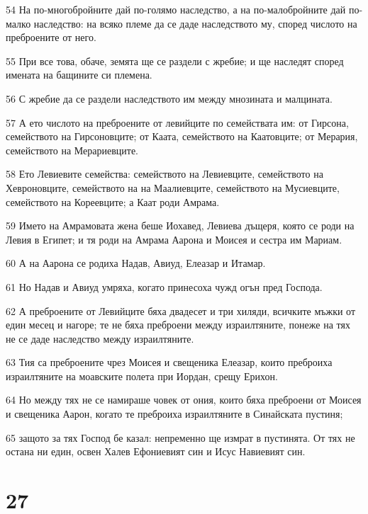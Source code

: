\par 54 На по-многобройните дай по-голямо наследство, а на по-малобройните дай по-малко наследство: на всяко племе да се даде наследството му, според числото на преброените от него.
\par 55 При все това, обаче, земята ще се раздели с жребие; и ще наследят според имената на бащините си племена.
\par 56 С жребие да се раздели наследството им между мнозината и малцината.
\par 57 А ето числото на преброените от левийците по семействата им: от Гирсона, семейството на Гирсоновците; от Каата, семейството на Каатовците; от Мерария, семейството на Мерариевците.
\par 58 Ето Левиевите семейства: семейството на Левиевците, семейството на Хевроновците, семейството на на Маалиевците, семейството на Мусиевците, семейството на Кореевците; а Каат роди Амрама.
\par 59 Името на Амрамовата жена беше Иохавед, Левиева дъщеря, която се роди на Левия в Египет; и тя роди на Амрама Аарона и Моисея и сестра им Мариам.
\par 60 А на Аарона се родиха Надав, Авиуд, Елеазар и Итамар.
\par 61 Но Надав и Авиуд умряха, когато принесоха чужд огън пред Господа.
\par 62 А преброените от Левийците бяха двадесет и три хиляди, всичките мъжки от един месец и нагоре; те не бяха преброени между израилтяните, понеже на тях не се даде наследство между израилтяните.
\par 63 Тия са преброените чрез Моисея и свещеника Елеазар, които преброиха израилтяните на моавските полета при Иордан, срещу Ерихон.
\par 64 Но между тях не се намираше човек от ония, които бяха преброени от Моисея и свещеника Аарон, когато те преброиха израилтяните в Синайската пустиня;
\par 65 защото за тях Господ бе казал: непременно ще измрат в пустинята. От тях не остана ни един, освен Халев Ефониевият син и Исус Навиевият син.

\chapter{27}

